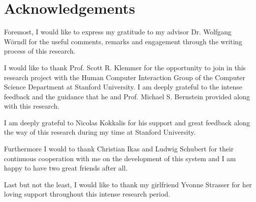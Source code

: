 \clearemptydoublepage
{}
{}	

\chapter*{Acknowledgements}

Foremost, I would like to express my gratitude to my advisor Dr. Wolfgang W{\"o}rndl for the useful comments, remarks and engagement through the writing process of this research.
\vspace{1cm}

I would like to thank Prof. Scott R. Klemmer for the opportunity to join in this research project with the Human Computer Interaction Group of the Computer Science Department at Stanford University. I am deeply grateful to the intense feedback and the guidance that he and Prof. Michael S. Bernstein provided along with this research.
\vspace{1cm}

I am deeply grateful to Nicolas Kokkalis for his support and great feedback along the way of this research during my time at Stanford University.
\vspace{1cm}

Furthermore I would to thank Christian Ikas and Ludwig Schubert for their continuous cooperation with me on the development of this system and I am happy to have two great friends after all.
\vspace{1cm}

Last but not the least, I would like to thank my girlfriend Yvonne Strasser for her loving support throughout this intense research period.